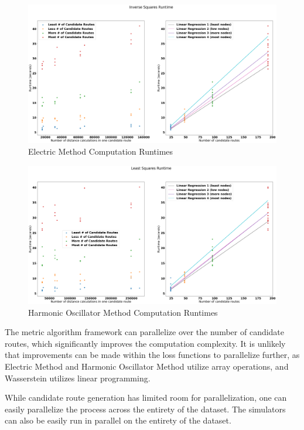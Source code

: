 \documentclass{article}
\numberwithin{equation}{section}
\theoremstyle{definition}
\begin{document}
\begin{figure}
    \centering
    \includegraphics[scale = 0.25]{Jupyter Notebook LaTeX/complexity2.png}
    \caption{Electric Method Computation Runtimes}
    \label{fig:elec-comp-complex}
\end{figure}

\begin{figure}
    \centering
    \includegraphics[scale = 0.25]{Jupyter Notebook LaTeX/complexity1.png}
    \caption{Harmonic Oscillator Method Computation Runtimes}
    \label{fig:hom-comp-complex}
\end{figure}

The metric algorithm framework can parallelize over the number of candidate routes, which significantly improves the computation complexity. It is unlikely that improvements can be made within the loss functions to parallelize further, as Electric Method and Harmonic Oscillator Method utilize array operations, and Wasserstein utilizes linear programming.

While candidate route generation has limited room for parallelization, one can easily parallelize the process across the entirety of the dataset. The simulators can also be easily run in parallel on the entirety of the dataset.
\end{document}
